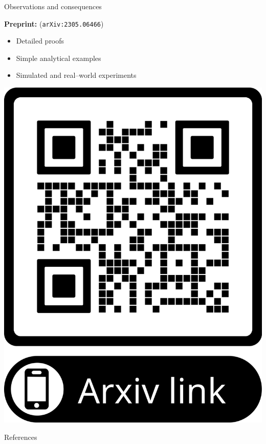 \begin{frame}{Observations and consequences}
\pause
\begin{minipage}{0.8\textwidth}
\textbf{Preprint: }\citet{giordano:2023:bayesij}  (\texttt{arXiv:2305.06466})
%
\begin{itemize}
\item Detailed proofs
\item Simple analytical examples
\item Simulated and real--world experiments
\end{itemize}
%
\end{minipage}
\begin{minipage}{0.15\textwidth}
    \includegraphics[width=1.0\textwidth]{qr_code_arxiv.png}
\end{minipage}
    
\end{frame}




\begin{frame}{References}

\footnotesize


\begingroup
\renewcommand{\section}[2]{}%

\endgroup

%
\end{frame}
